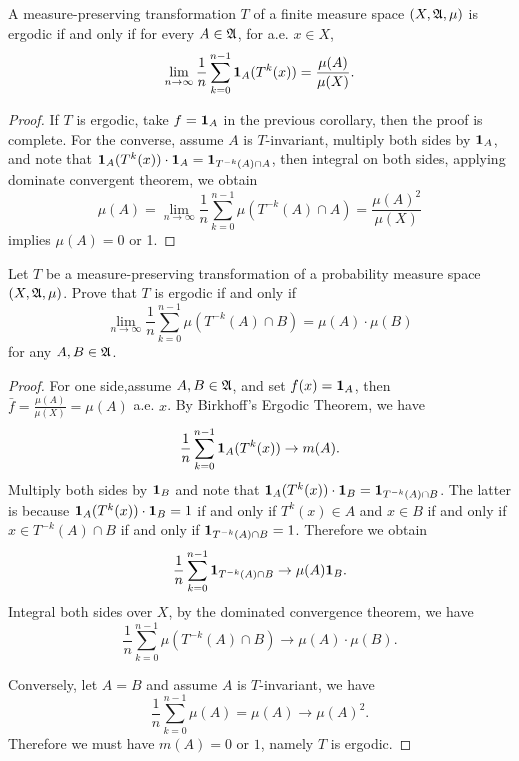 \documentclass[12pt,a4paper]{article}
\begin{document}
	
	\begin{corollary}{}{}
		A measure-preserving transformation $T$ of a finite measure space $(X,\mathfrak{A},\mu)$ is ergodic if and only if for every $A\in \mathfrak{A}$, for a.e. $x\in X$,
		$$
		\lim_{n\to \infty}\frac{1}{n}\sum_{k=0}^{n-1}\mathbf{1}_A (T^k(x))=\frac{\mu(A)}{\mu(X)}.
		$$
	\end{corollary}
	\begin{proof}
		If $T$ is ergodic, take $f=\mathbf{1}_A$ in the previous corollary, then the proof is complete. For the converse, assume $A$ is $T$-invariant, multiply both sides by $\mathbf{1}_A$, and note that $\mathbf{1}_A(T^k(x))\cdot \mathbf{1}_A=\mathbf{1}_{T^{-k}(A)\cap A}$, then integral on both sides, applying dominate convergent theorem, we obtain
		$$
		\mu(A)=\lim_{n\to\infty}\frac{1}{n}\sum_{k=0}^{n-1}\mu(T^{-k}(A)\cap A)=\frac{\mu(A)^2}{\mu(X)}
		$$
		implies $\mu(A)=0$ or 1.
	\end{proof}
	\begin{corollary}{}{}
		Let $T$ be a measure-preserving transformation of a probability measure space $(X,\mathfrak{A},\mu)$. Prove that $T$  is ergodic if and only if
		$$
		\lim_{n\to\infty}\frac{1}{n} \sum_{k=0}^{n-1}\mu(T^{-k}(A)\cap B)=\mu(A)\cdot \mu(B)
		$$
		for any $A,B\in \mathfrak{A}$.
	\end{corollary}
	\begin{proof}
		For one side,assume $A,B\in \mathfrak{A}$, and set $f(x)=\mathbf{1}_A$, then $\bar{f}=\frac{\mu(A)}{\mu(X)}=\mu(A)$ a.e. $x$. By Birkhoff's Ergodic Theorem, we have
		$$
		\frac{1}{n}\sum_{k=0}^{n-1}\mathbf{1}_A (T^k(x))\to m(A).
		$$
		Multiply both sides by $\mathbf{1}_B$ and note that $\mathbf{1}_A(T^k(x))\cdot \mathbf{1}_B=\mathbf{1}_{T^{-k}(A)\cap B}$. The latter is because $\mathbf{1}_A(T^k(x))\cdot \mathbf{1}_B=1$ if and only if $T^k(x)\in A$ and $x\in B$ if and only if $x\in T^{-k}(A)\cap B$ if and only if $\mathbf{1}_{T^{-k}(A)\cap B}=1$. Therefore we obtain
		$$
		\frac{1}{n}\sum_{k=0}^{n-1}\mathbf{1}_{T^{-k}(A)\cap B}\to \mu(A)\mathbf{1}_B.
		$$
		Integral both sides over $X$, by the dominated convergence theorem, we have
		$$
		\frac{1}{n}\sum_{k=0}^{n-1}\mu(T^{-k}(A)\cap B)\to \mu(A)\cdot \mu(B).
		$$
		
		Conversely, let $A=B$ and assume $A$ is $T$-invariant, we have
		$$
		\frac{1}{n}\sum_{k=0}^{n-1}\mu(A)=\mu(A)\to \mu(A)^2.
		$$
		Therefore we must have $m(A)=0$ or $1$, namely $T$ is ergodic.
	\end{proof}
	
\end{document}
